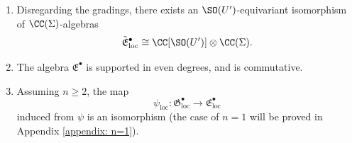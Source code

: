 \documentclass[11pt]{article}
\begin{document}
\begin{claim}\label{claim: loc thm}\begin{enumerate}
    \item Disregarding the gradings, there exists an $\SO(U')$-equivariant isomorphism of $\CC(\Sigma)$-algebras $$\tilde{\mathfrak{E}}^\bullet_\mathrm{loc} \cong \CC[\SO(U')]\otimes \CC(\Sigma).$$
    \item The algebra $\mathfrak{E}^\bullet$ is supported in even degrees, and is commutative.
    \item Assuming $n\geq 2$, the map $$\psi_\mathrm{loc}:\mathfrak{G}^\bullet_\mathrm{loc}\to \mathfrak{E}^\bullet_\mathrm{loc}$$ induced from $\psi$ is an isomorphism (the case of $n=1$ will be proved in Appendix \ref{appendix: n=1}).
\end{enumerate}
\end{claim}
\end{document}
